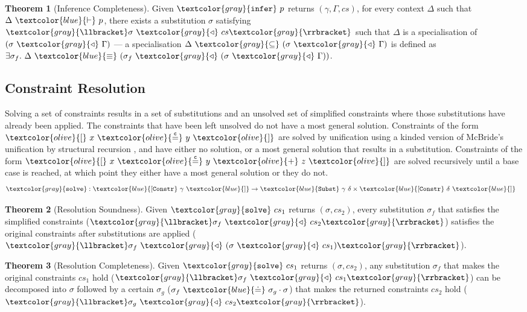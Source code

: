 \documentclass[sigplan,screen,review]{acmart}
\theoremstyle{definition}\newtheorem{mytheorem}{Theorem}[section]
\newcommand{\constr}[1]{\textcolor{olive}{\mathtt{#1}}}
\newcommand{\func}[1]{\textcolor{gray}{\mathtt{#1}}}
\newcommand{\type}[1]{\textcolor{blue}{\mathtt{#1}}}
\newcommand{\tEq}[2]{#1~\type{\equiv}~#2}
\newcommand{\tProc}[2]{#1 ~ \type{\vdash} ~ #2}
\newcommand{\tConstrs}[1]{\type{[Constr} ~ #1 ~ \type{]}}
\newcommand{\subst}[2]{#1 ~ \func{\triangleleft} ~ #2}
\newcommand{\tSubst}[2]{\type{Subst}~#1~#2}
\newcommand{\interpr}[1]{\func{\llbracket} #1 \func{\rrbracket}}
\newcommand{\eqconstr}[2]{\constr{[} ~ #1 ~ \constr{\stackrel{c}{=}} ~ #2 ~ \constr{]}}
\newcommand{\sumconstr}[3]{\constr{[} ~ #1 ~ \constr{\stackrel{c}{=}} ~ #2 ~ \constr{+} ~ #3 ~ \constr{]}}
\begin{document}
\begin{mytheorem}[Inference Completeness]\label{inference-completeness}
Given $\func{infer}~p$ returns $(\gamma , \Gamma , cs)$, for every context \(\Delta\) such that $\tProc{\Delta}{p}$, there exists a substitution \(\sigma\) satisfying $\interpr{\subst{\sigma}{cs}}$ such that $\Delta$ is a specialisation of $(\subst{\sigma}{\Gamma})$ --- a specialisation $\Delta ~ \func{\subseteq} ~ (\subst{\sigma}{\Gamma})$ is defined as $\exists \sigma_f . ~ \tEq{\Delta}{(\subst{\sigma_f}{(\subst{\sigma}{\Gamma})})}$.
\end{mytheorem}

\subsection{Constraint Resolution}
\label{constraint-resolution}

Solving a set of constraints results in a set of substitutions and an unsolved set of simplified constraints where those substitutions have already been applied.
The constraints that have been left unsolved do not have a most general solution.
Constraints of the form $\eqconstr{x}{y}$ are solved by unification using a kinded version of McBride's unification by structural recursion \cite{McBride03}, and have either no solution, or a most general solution that results in a substitution.
Constraints of the form $\sumconstr{x}{y}{z}$ are solved recursively until a base case is reached, at which point they either have a most general solution or they do not.
$$
\begin{aligned}
\func{solve} &: \tConstrs{\gamma} \to \tSubst{\gamma}{\delta} \times \tConstrs{\delta}
\end{aligned}
$$

\begin{mytheorem}[Resolution Soundness]\label{resolution-soundness}
Given $\func{solve}~cs_1$ returns $(\sigma, cs_2)$, every substitution $\sigma_f$ that satisfies the simplified constraints ($\interpr{\subst{\sigma_f}{cs_2}}$) satisfies the original constraints after substitutions are applied ($\interpr{\subst{\sigma_f}{(\subst{\sigma}{cs_1})}}$).
\end{mytheorem}

\begin{mytheorem}[Resolution Completeness]\label{resolution-completeness}
Given $\func{solve}~cs_1$ returns $(\sigma, cs_2)$, any substitution \(\sigma_f\) that makes the original constraints \(cs_1\) hold ($\interpr{\subst{\sigma_f}{cs_1}}$) can be decomposed into $\sigma$ followed by a certain \(\sigma_g\) ($\sigma_f ~ \type{\doteq} ~ \sigma_g \cdot \sigma$) that makes the returned constraints \(cs_2\) hold ($\interpr{\subst{\sigma_g}{cs_2}}$).
\end{mytheorem}
\end{document}
